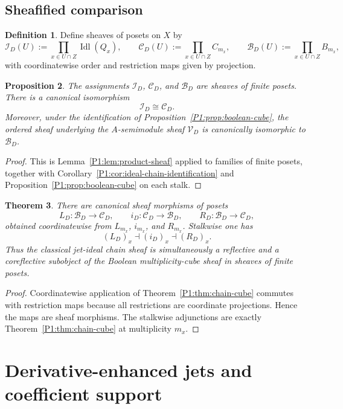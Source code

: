\documentclass[11pt,a4paper]{article}
\numberwithin{equation}{section}
\newtheorem{theorem}{Theorem}[section]
\newtheorem{proposition}[theorem]{Proposition}
\theoremstyle{definition}
\newtheorem{definition}[theorem]{Definition}
\theoremstyle{remark}
\DeclareMathOperator{\Idl}{Idl}
\newcommand{\cV}{\mathcal V}
\newcommand{\cB}{\mathcal B}
\newcommand{\cI}{\mathcal I}
\newcommand{\cC}{\mathcal C}
\begin{document}
\subsection{Sheafified comparison}

\begin{definition}
Define sheaves of posets on $X$ by
\[
\cI_D(U):=\prod_{x\in U\cap Z}\Idl(Q_x),
\qquad
\cC_D(U):=\prod_{x\in U\cap Z}C_{m_x},
\qquad
\cB_D(U):=\prod_{x\in U\cap Z}B_{m_x},
\]
with coordinatewise order and restriction maps given by projection.
\end{definition}

\begin{proposition}\label{P1:prop:sheaves-posets}
The assignments $\cI_D$, $\cC_D$, and $\cB_D$ are sheaves of finite posets.  There is a canonical isomorphism
\[
\cI_D\cong\cC_D.
\]
Moreover, under the identification of Proposition~\ref{P1:prop:boolean-cube}, the ordered sheaf underlying the $A$-semimodule sheaf $\cV_D$ is canonically isomorphic to $\cB_D$.
\end{proposition}

\begin{proof}
This is Lemma~\ref{P1:lem:product-sheaf} applied to families of finite posets, together with Corollary~\ref{P1:cor:ideal-chain-identification} and Proposition~\ref{P1:prop:boolean-cube} on each stalk.
\end{proof}

\begin{theorem}\label{P1:thm:sheafified-chain-cube}
There are canonical sheaf morphisms of posets
\[
L_D:\cB_D\to\cC_D,
\qquad
i_D:\cC_D\to\cB_D,
\qquad
R_D:\cB_D\to\cC_D,
\]
obtained coordinatewise from $L_{m_x}$, $i_{m_x}$, and $R_{m_x}$.  Stalkwise one has
\[
(L_D)_x\dashv (i_D)_x\dashv (R_D)_x.
\]
Thus the classical jet-ideal chain sheaf is simultaneously a reflective and a coreflective subobject of the Boolean multiplicity-cube sheaf in sheaves of finite posets.
\end{theorem}

\begin{proof}
Coordinatewise application of Theorem~\ref{P1:thm:chain-cube} commutes with restriction maps because all restrictions are coordinate projections.  Hence the maps are sheaf morphisms.  The stalkwise adjunctions are exactly Theorem~\ref{P1:thm:chain-cube} at multiplicity $m_x$.
\end{proof}

\section{Derivative-enhanced jets and coefficient support}
\end{document}
